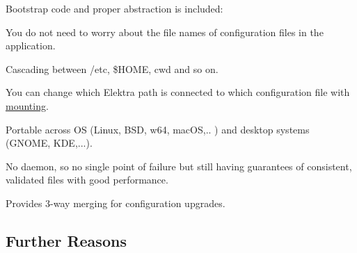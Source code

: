 \begin{DoxyItemize}
\item Bootstrap code and proper abstraction is included\+:
\begin{DoxyItemize}
\item You do not need to worry about the file names of configuration files in the application.
\item Cascading between {\ttfamily /etc}, {\ttfamily \$\+H\+O\+ME}, {\ttfamily cwd} and so on.
\item You can change which Elektra path is connected to which configuration file with \hyperlink{doc_help_elektra-mounting_md}{mounting}.
\item Portable across OS (Linux, B\+SD, w64, mac\+OS,.. ) and desktop systems (G\+N\+O\+ME, K\+DE,...).
\end{DoxyItemize}
\item No daemon, so no single point of failure but still having guarantees of consistent, validated files with good performance.
\item Provides 3-\/way merging for configuration upgrades.
\end{DoxyItemize}

\subsection*{Further Reasons}


